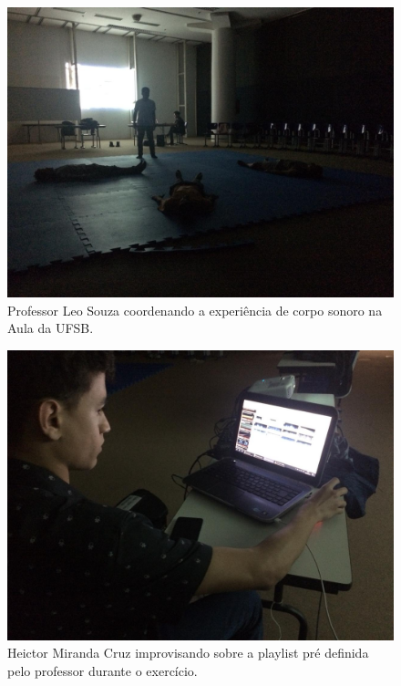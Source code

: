 \begin{figure}

\includegraphics[width=1\textwidth]{pictures/cap4/leo_ufsb}
\caption{\label{psufsb}Professor Leo Souza coordenando a experiência de corpo sonoro na Aula da UFSB.}
\label{fig:psufsb}
\end{figure}

\begin{figure}

\includegraphics[width=1\textwidth]{pictures/cap4/heitor_ufsb}
\caption{\label{psufsb2}Heictor Miranda Cruz improvisando sobre a playlist pré definida pelo professor durante o exercício.}
\label{fig:psufsb2}
\end{figure}

